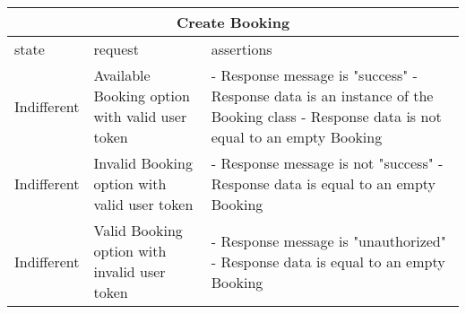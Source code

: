 \begin{center}
	\begin{tabular}{|p{}|p{}|p{}|}
		\hline
		\multicolumn{3}{c}{Create Booking}\\
		
		\hline
		state & request & assertions \\
		
		\hline
		Indifferent & 
		Available Booking option with valid user token &
		- Response message is "success" \newline
		- Response data is an instance of the Booking class \newline
		- Response data is not equal to an empty Booking
		\\
		
		\hline
		Indifferent & 
		Invalid Booking option with valid user token &
		- Response message is not "success" \newline
		- Response data is equal to an empty Booking
		\\
		
		\hline
		Indifferent & 
		Valid Booking option with invalid user token &
		- Response message is "unauthorized" \newline
		- Response data is equal to an empty Booking
		\\
		
		\hline
		
	\end{tabular}
\end{center}

